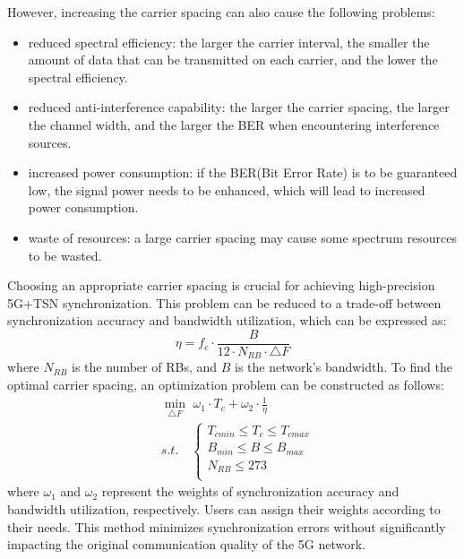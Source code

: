 \documentclass[english]{cccconf}
\begin{document}
However, increasing the carrier spacing can also cause the following problems:
\begin{itemize}
	\item reduced spectral efficiency: the larger the carrier interval, the smaller the amount of data that can be transmitted on each carrier, and the lower the spectral efficiency.
	
	\item reduced anti-interference capability: the larger the carrier spacing, the larger the channel width, and the larger the BER when encountering interference sources.
	
	\item increased power consumption: if the BER(Bit Error Rate) is to be guaranteed low, the signal power needs to be enhanced, which will lead to increased power consumption.
	
	\item waste of resources: a large carrier spacing may cause some spectrum resources to be wasted.
\end{itemize}
Choosing an appropriate carrier spacing is crucial for achieving high-precision 5G+TSN synchronization. This problem can be reduced to a trade-off between synchronization accuracy and bandwidth utilization, which can be expressed as:
\begin{equation}
	\eta=f_c\cdot \frac{B}{12\cdot N_{RB}\cdot \triangle F}
\end{equation}
where $N_{RB}$ is the number of RBs, and $B$ is the network's bandwidth. To find the optimal carrier spacing, an optimization problem can be constructed as follows:
\begin{equation}
	\begin{split}
		&\min_{\triangle F} \,\, \omega_1 \cdot T_c+\omega_2 \cdot \frac{1}{\eta} \\
		&s.t.\quad  \left\{\begin{array}{lc}
			T_{cmin}\leq T_c \leq T_{cmax}\\
			B_{min}\leq B \leq B_{max}\\
			N_{RB}\leq 273\\
		\end{array}\right.
	\end{split}
\end{equation}
where $\omega_1$ and $\omega_2$ represent the weights of synchronization accuracy and bandwidth utilization, respectively. Users can assign their weights according to their needs. This method minimizes synchronization errors without significantly impacting the original communication quality of the 5G network.
\end{document}
